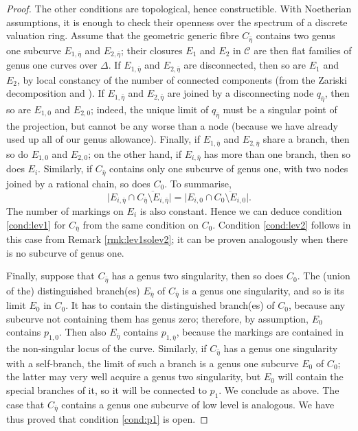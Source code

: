 \documentclass{compositio}
\newcommand{\dvr}{\Delta}
\theoremstyle{plain}
\theoremstyle{definition}
\theoremstyle{remark}
\begin{document}
\begin{proof}
 The other conditions are topological, hence constructible. With Noetherian assumptions, it is enough to check their openness over the spectrum of a discrete valuation ring. Assume that the geometric generic fibre $C_{\bar\eta}$ contains two genus one subcurve $E_{1,\bar\eta}$ and $E_{2,\bar\eta}$; their closures $E_1$ and $E_2$ in $\mathcal C$ are then flat families of genus one curves over $\dvr$. If $E_{1,\bar\eta}$ and $E_{2,\bar\eta}$ are disconnected, then so are $E_1$ and $E_2$, by local constancy of the number of connected components (from the Zariski decomposition and \cite[\href{https://stacks.math.columbia.edu/tag/0E0D}{Tag 0E0D}]{stacks-project}). If $E_{1,\bar\eta}$ and $E_{2,\bar\eta}$ are joined by a disconnecting node $q_{\bar\eta}$, then so are $E_{1,0}$ and $E_{2,0}$; indeed, the unique limit of $q_{\bar\eta}$ must be a singular point of the projection, but cannot be any worse than a node (because we have already used up all of our genus allowance). Finally, if $E_{1,\bar\eta}$ and $E_{2,\bar\eta}$ share a branch, then so do $E_{1,0}$ and $E_{2,0}$; on the other hand, if $E_{i,\bar\eta}$ has more than one branch, then so does $E_i$. Similarly, if $C_{\bar\eta}$ contains only one subcurve of genus one, with two nodes joined by a rational chain, so does $C_0$. To summarise,
 \[\lvert E_{i,\bar\eta}\cap\overline{C_{\bar\eta}\setminus E_{i,\bar\eta}}\rvert=\lvert E_{i,0}\cap\overline{C_{0}\setminus E_{i,0}}\rvert.\]
 The number of markings on $E_i$ is also constant. Hence we can deduce condition \eqref{cond:lev1} for $C_{\bar\eta}$ from the same condition on $C_0$. Condition \eqref{cond:lev2} follows in this case from Remark \ref{rmk:lev1solev2}; it can be proven analogously when there is no subcurve of genus one.
 
 Finally, suppose that $C_{\bar\eta}$ has a genus two singularity, then so does $C_0$. The (union of the) distinguished branch(es) $E_{\bar\eta}$ of $C_{\bar\eta}$ is a genus one singularity, and so is its limit $E_0$ in $C_0$. It has to contain the distinguished branch(es) of $C_0$, because any subcurve not containing them has genus zero; therefore, by assumption, $E_0$ contains $p_{1,0}$. Then also $E_{\bar\eta}$ contains $p_{1,\bar\eta}$, because the markings are contained in the non-singular locus of the curve. Similarly, if $C_{\bar\eta}$ has a genus one singularity with a self-branch, the limit of such a branch is a genus one subcurve $E_0$ of $C_0$; the latter may very well acquire a genus two singularity, but $E_0$ will contain the special branches of it, so it will be connected to $p_1$. We conclude as above. The case that $C_{\bar\eta}$ contains a genus one subcurve of low level is analogous. We have thus proved that condition \eqref{cond:p1} is open.
\end{proof}
\end{document}
